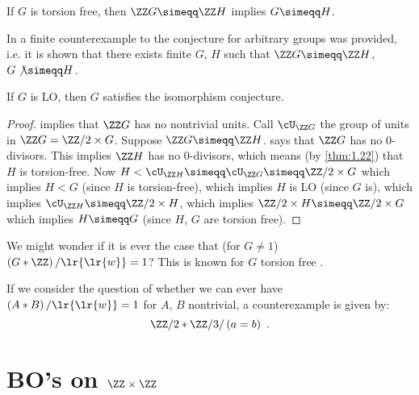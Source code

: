 \begin{con}
If $G$ is torsion free, then $\ZZ G \simeqq \ZZ H$ implies $G\simeqq H$.
\end{con}

\begin{rmk}
In \cite{hertweck} a finite counterexample to the conjecture for arbitrary groups was
provided, i.e. it is shown that
there exists finite $G$, $H$ such that $\ZZ G \simeqq \ZZ H$, $G\not\simeqq H$.
\end{rmk}

\begin{cor}[\cite{LR}]
If $G$ is LO, then $G$ satisfies the isomorphism conjecture.
\label{cor:1.24}
\end{cor}
\begin{proof}
 implies that $\ZZ G$ has no nontrivial units. Call $\cU_{\ZZ G}$ the group
of units in $\ZZ G = \ZZ/ 2 \times G$. 
Suppose $\ZZ G \simeqq \ZZ H$.  says that $\ZZ G$ has no $0$-divisors. This
implies $\ZZ H$ has no $0$-divisors, which means (by \cref{thm:1.22}) that $H$ is
torsion-free.
Now $H < \cU_{\ZZ H} \simeqq \cU_{\ZZ G} \simeqq \ZZ / 2 \times G$ which implies $H < G$
(since $H$ is torsion-free), which implies $H$ is LO (since $G$ is), which implies
$\cU_{\ZZ H} \simeqq \ZZ / 2 \times H$, which implies $\ZZ / 2 \times H \simeqq \ZZ / 2
\times G$ which implies $H\simeqq G$ (since $H$, $G$ are torsion free).
\end{proof}

\begin{rmk}
We might wonder if
it is ever the case that (for $G\neq 1$)
$\left(G * \ZZ\right) / \lr{\lr{w}} = 1$? This is known for 
$G$ torsion free \cite{klyachko}.
\end{rmk}
\begin{cexm}
If we consider the question of whether
we can ever have $\left(A* B\right) / \lr{\lr{w}} = 1$ for $A$, $B$ nontrivial, a
counterexample is given by:
\begin{equation*}
\ZZ / 2 * \ZZ / 3 / \left(a=b\right) \ .
\end{equation*}
\end{cexm}

\section{BO's on \texorpdfstring{$\ZZ \times \ZZ$}{Z x Z}}


